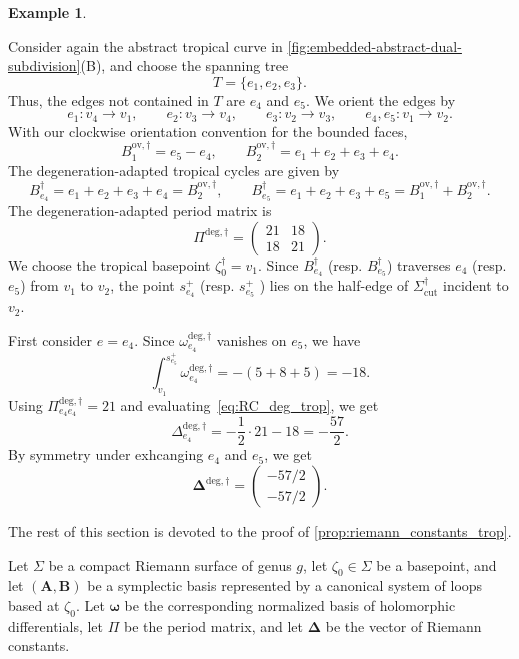 \documentclass[12pt]{amsart}
\numberwithin{equation}{section}
\theoremstyle{definition}
\newtheorem{example}[theorem]{Example}
\def\trop{\dagger}
\def\vecRC{\bm{\Delta}}
\def\RC{{\Delta}}
\def\ptSig{\zeta}
\def\basept{{\ptSig_0}}
\def\baseptT{{\ptSig_0^\trop}}
\def\mcurve{\Sigma}
\def\tropmcurve{\mcurve^\trop}
\begin{document}
\begin{example}
\label{ex:riemann_constants_non_smooth}

Consider again the abstract tropical curve in
\cref{fig:embedded-abstract-dual-subdivision}(B), and choose the
spanning tree
\[
T=\{e_1,e_2,e_3\}.
\]
Thus, the edges not contained in $T$ are $e_4$ and $e_5$.
We orient the edges by
\[
e_1:v_4\to v_1,\qquad
e_2:v_3\to v_4,\qquad
e_3:v_2\to v_3,
\qquad
e_4,e_5:v_1\to v_2.
\]
With our clockwise orientation convention for the bounded faces,
\[
B_1^{\mathrm{ov},\trop}
=
e_5-e_4,
\qquad
B_2^{\mathrm{ov},\trop}
=
e_1+e_2+e_3+e_4.
\]
The degeneration-adapted tropical cycles are given by
\[
B_{e_4}^\trop
=
e_1+e_2+e_3+e_4=B_2^{\mathrm{ov},\trop},
\qquad
B_{e_5}^\trop
=
e_1+e_2+e_3+e_5=B_1^{\mathrm{ov},\trop}
+
B_2^{\mathrm{ov},\trop}.
\]
The degeneration-adapted period matrix is
\[
\Pi^{\mathrm{deg},\trop}
=
\begin{pmatrix}
21&18\\
18&21
\end{pmatrix}.
\]
We choose the tropical basepoint
$
\baseptT=v_1.
$
Since $B_{e_4}^\trop$ (resp. $B_{e_5}^\trop$) traverses $e_4$ (resp. $e_5$) from $v_1$ to $v_2$, the point
$
s_{e_4}^+
$
(resp.
$
s_{e_5}^+
$
) lies on the half-edge of $\tropmcurve_{\mathrm{cut}}$ incident to
$v_2$.

First consider $e=e_4$. Since
$\omega_{e_4}^{\mathrm{deg},\trop}$ vanishes on $e_5$, we have
\[
\int_{v_1}^{s_{e_5}^+}
\omega_{e_4}^{\mathrm{deg},\trop}
=
-(5+8+5)
=
-18.
\]
Using
$
\Pi_{e_4e_4}^{\mathrm{deg},\trop}=21$ and evaluating~\eqref{eq:RC_deg_trop}, we get
\[
\RC_{e_4}^{\mathrm{deg},\trop}
=
-\frac12\cdot21-18
=
-\frac{57}{2}.
\]
By symmetry under exhcanging $e_4$ and $e_5$, we get
\[
\vecRC^{\mathrm{deg},\trop}
=
\begin{pmatrix}
-{57}/{2}\\
-{57}/{2}
\end{pmatrix}.
\]
\end{example}







The rest of this section is devoted to the proof of
\cref{prop:riemann_constants_trop}.


Let $\mcurve$ be a compact Riemann surface of genus $g$, let
$\basept\in\mcurve$ be a basepoint, and let $(\bm A,\bm B)$ be a
symplectic basis represented by a canonical system of loops based at
$\basept$. Let $\bm\omega$ be the corresponding normalized basis of
holomorphic differentials, let $\Pi$ be the period matrix, and let
$\vecRC$ be the vector of Riemann constants.
\end{document}
